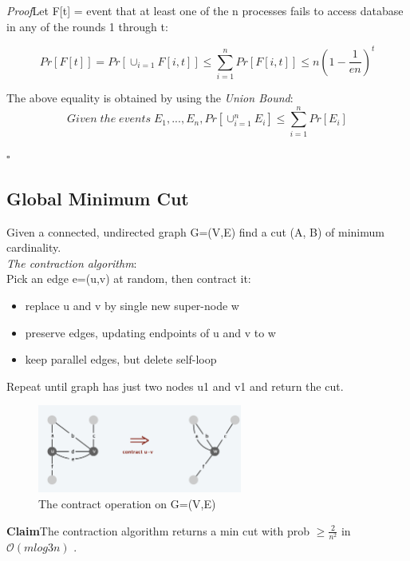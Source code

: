 \documentclass[11pt]{article}
\newenvironment{claim}[1]{\par\textbf{Claim}\space#1}{}
\newenvironment{proof}[1]{\par\textit{Proof}\space#1}{\hfill\ensuremath{\square}}
\begin{document}
\begin{proof}
Let F[t] = event that at least one of the n processes fails to access database in any of the rounds 1 through t:

\[Pr[F[t]]=Pr[ \cup_{i=1} F[i,t]] \leq \sum_{i=1}^{n} Pr[F[i,t]] \leq n(1−\frac{1}{en})^{t}\]

The above equality is obtained by using the \emph{Union Bound}:
\[Given \; the \; events \; E_{1}, ..., E_{n}, Pr[\cup_{i=1}^{n}E_{i}] \leq \sum_{i=1}^{n}Pr[E_{i}]\]

\end{proof}

\subsection{Global Minimum Cut}
Given a connected, undirected graph G=(V,E) find a cut (A, B) of minimum cardinality.\\

\emph{The contraction algorithm}:\\
Pick an edge e=(u,v) at random, then contract it:

\begin{itemize}

\item {replace u and v by single new super-node w}\\
\item {preserve edges, updating endpoints of u and v to w}\\
\item{keep parallel edges, but delete self-loop}\\

\end{itemize}

Repeat until graph has just two nodes u1 and v1 and return the cut.

\begin{figure}[H]
		\centering
		\includegraphics[width=0.6\textwidth ]{contract}
		\caption{The contract operation on G=(V,E)}
\end{figure}

\begin{claim}
The contraction algorithm returns a min cut with prob $\geq \frac{2}{n^{2}}$ in $\mathcal{O}(m log3 n)$ .
\end{claim}\\
\end{document}
